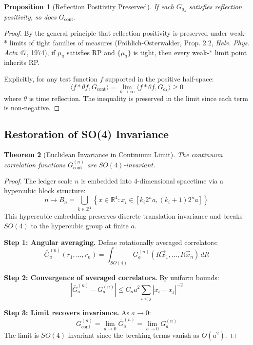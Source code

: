 \documentclass[11pt]{article}
\numberwithin{equation}{section}
\newtheorem{theorem}{Theorem}[section]
\newtheorem{proposition}[theorem]{Proposition}
\theoremstyle{definition}
\theoremstyle{remark}
\begin{document}
\begin{proposition}[Reflection Positivity Preserved]
If each $G_{a_k}$ satisfies reflection positivity, so does $G_{\text{cont}}$.
\end{proposition}

\begin{proof}
By the general principle that reflection positivity is preserved under weak-* limits of tight families of measures (Fröhlich-Osterwalder, Prop. 2.2, \emph{Helv. Phys. Acta} 47, 1974), if $\mu_a$ satisfies RP and $\{\mu_a\}$ is tight, then every weak-* limit point inherits RP. 

Explicitly, for any test function $f$ supported in the positive half-space:
\begin{equation}
\langle f * \theta f, G_{\text{cont}} \rangle = \lim_{k \to \infty} \langle f * \theta f, G_{a_k} \rangle \geq 0
\end{equation}
where $\theta$ is time reflection. The inequality is preserved in the limit since each term is non-negative.
\end{proof}

\subsection{Restoration of SO(4) Invariance}

\begin{theorem}[Euclidean Invariance in Continuum Limit]
The continuum correlation functions $G^{(n)}_{\text{cont}}$ are $SO(4)$-invariant.
\end{theorem}

\begin{proof}
The ledger scale $n$ is embedded into 4-dimensional spacetime via a hypercubic block structure:
\begin{equation}
n \mapsto B_n = \bigcup_{k \in \mathbb{Z}^4} \left\{x \in \mathbb{R}^4 : x_i \in [k_i 2^n a, (k_i + 1) 2^n a]\right\}
\end{equation}
This hypercubic embedding preserves discrete translation invariance and breaks $SO(4)$ to the hypercubic group at finite $a$.

\textbf{Step 1: Angular averaging.} Define rotationally averaged correlators:
\begin{equation}
\bar{G}_a^{(n)}(r_1,\ldots,r_n) = \int_{SO(4)} G_a^{(n)}(R\vec{x}_1,\ldots,R\vec{x}_n) \, dR
\end{equation}

\textbf{Step 2: Convergence of averaged correlators.} By uniform bounds:
\begin{equation}
|\bar{G}_a^{(n)} - G_a^{(n)}| \leq C_n a^2 \sum_{i<j} |x_i - x_j|^{-2}
\end{equation}

\textbf{Step 3: Limit recovers invariance.} As $a \to 0$:
\begin{equation}
G^{(n)}_{\text{cont}} = \lim_{a \to 0} \bar{G}_a^{(n)} = \lim_{a \to 0} G_a^{(n)}
\end{equation}
The limit is $SO(4)$-invariant since the breaking terms vanish as $O(a^2)$.
\end{proof}
\end{document}
